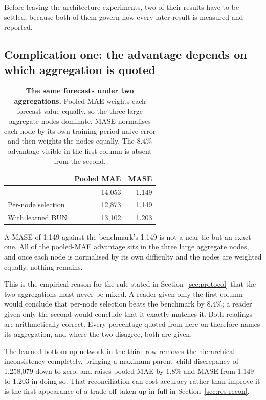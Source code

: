 Before leaving the architecture experiments, two of their results have to be settled,
because both of them govern how every later result is measured and reported.

\subsection{Complication one: the advantage depends on which aggregation is quoted}

\begin{table}[htp]
\centering
\begin{tabular}{lrr}
\toprule
& {\bf Pooled MAE} & {\bf MASE} \\
\midrule
\naiveA{} & 14,053 & 1.149 \\
Per-node selection & 12,873 & 1.149 \\
With learned BUN & 13,102 & 1.203 \\
\bottomrule
\end{tabular}
\caption[Two aggregations of the expert system]{\textbf{The same forecasts under two
aggregations.} Pooled MAE weights each forecast value equally, so the three large aggregate
nodes dominate. MASE normalises each node by its own training-period naive error and then
weights the nodes equally. The 8.4\% advantage visible in the first column is absent from
the second.}
\label{tab:es-agg}
\end{table}

A MASE of 1.149 against the benchmark's 1.149 is not a near-tie but an exact one. All of
the pooled-MAE advantage sits in the three large aggregate nodes, and once each node is
normalised by its own difficulty and the nodes are weighted equally, nothing remains.

This is the empirical reason for the rule stated in Section~\ref{sec:protocol} that the two
aggregations must never be mixed. A reader given only the first column would conclude that
per-node selection beats the benchmark by 8.4\%; a reader given only the second would
conclude that it exactly matches it. Both readings are arithmetically correct. Every
percentage quoted from here on therefore names its aggregation, and where the two disagree,
both are given.

The learned bottom-up network in the third row removes the hierarchical inconsistency
completely, bringing a maximum parent--child discrepancy of 1,258,079 down to zero, and
raises pooled MAE by 1.8\% and MASE from 1.149 to 1.203 in doing so. That reconciliation
can cost accuracy rather than improve it is the first appearance of a trade-off taken up in
full in Section~\ref{sec:res-recon}.

